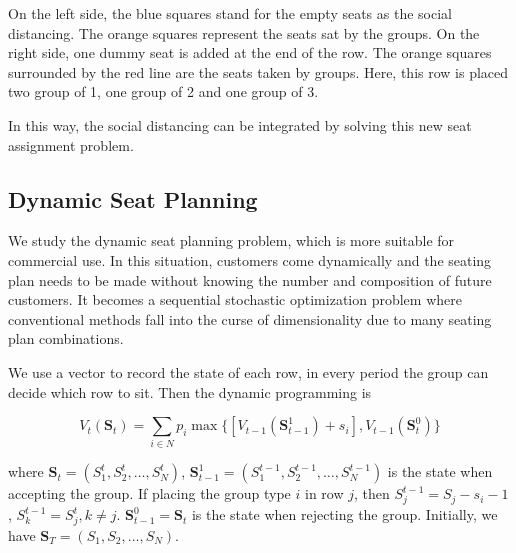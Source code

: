 On the left side, the blue squares stand for the empty seats as the social distancing. The orange squares represent the seats sat by the groups. 
On the right side, one dummy seat is added at the end of the row. The orange squares surrounded by the red line are the seats taken by groups. Here, this row is placed two group of 1, one group of 2 and one group of 3.

In this way, the social distancing can be integrated by solving this new seat assignment problem.








\subsection{Dynamic Seat Planning}\label{dynamic_demand}

We study the dynamic seat planning problem, which is more suitable for commercial use. In this situation, customers come dynamically and the seating plan needs to be made without knowing the number and composition of future customers. It becomes a sequential stochastic optimization problem where conventional methods fall into the curse of dimensionality due to many seating plan combinations. 

We use a vector to record the state of each row, in every period the group can decide which row to sit. Then the dynamic programming is

$$V_{t}(\mathbf{S}_{t}) = \sum_{i \in N} p_i \max\{ {[V_{t-1}(\mathbf{S}_{t-1}^{1})+ s_i]}, {V_{t-1}(\mathbf{S}_{t}^{0})}\}$$

where $\mathbf{S}_{t} = (S_1^{t}, S_2^{t}, \ldots, S_{N}^{t})$, $\mathbf{S}_{t-1}^{1} = (S_1^{t-1}, S_2^{t-1}, \ldots, S_{N}^{t-1})$ is the state when accepting the group. If placing the group type $i$ in row $j$, then $S_{j}^{t-1} = S_{j}-s_{i}-1$, $S_{k}^{t-1} = S_{j}^{t}, k \neq j$. $\mathbf{S}_{t-1}^{0} = \mathbf{S}_{t}$ is the state when rejecting the group. Initially, we have $\mathbf{S}_{T} = (S_1, S_2, \ldots, S_{N})$.

